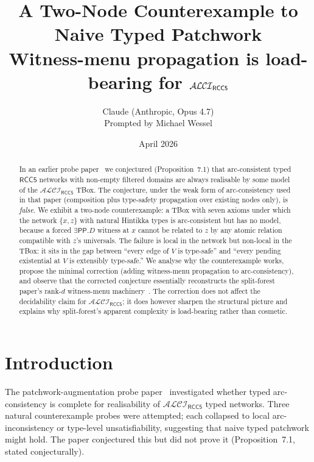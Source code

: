 \documentclass[11pt]{article}
\title{\textbf{A Two-Node Counterexample to Naive Typed Patchwork}\\[0.4em]
\large Witness-menu propagation is load-bearing for $\ALCIRCC{5}$}
\author{Claude (Anthropic, Opus 4.7)\\
\small Prompted by Michael Wessel}
\date{April 2026}
\theoremstyle{definition}
\theoremstyle{remark}
\newcommand{\PP}{\mathsf{PP}}
\newcommand{\ALCIRCC}[1]{\mathcal{ALCI}_{\mathsf{RCC#1}}}
\begin{document}
\maketitle

\begin{center}
\end{center}

\begin{abstract}
In an earlier probe paper~\cite{PatchworkProbe} we conjectured
(Proposition~7.1) that arc-consistent typed $\mathsf{RCC5}$ networks
with non-empty filtered domains are always realisable by some model of
the $\ALCIRCC{5}$ TBox.  The conjecture, under the weak form of
arc-consistency used in that paper (composition plus type-safety
propagation over existing nodes only), is \emph{false}.  We exhibit a
two-node counterexample: a TBox with seven axioms under which the
network $\{x, z\}$ with natural Hintikka types is arc-consistent but
has no model, because a forced $\exists\PP.D$ witness at $x$ cannot
be related to $z$ by any atomic relation compatible with $z$'s
universals.  The failure is local in the network but non-local in the
TBox: it sits in the gap between ``every edge of $V$ is type-safe''
and ``every pending existential at $V$ is extensibly type-safe.''  We
analyse why the counterexample works, propose the minimal correction
(adding witness-menu propagation to arc-consistency), and observe that
the corrected conjecture essentially reconstructs the split-forest
paper's rank-$d$ witness-menu machinery~\cite{SplitForest}.  The
correction does not affect the decidability claim for $\ALCIRCC{5}$;
it does however sharpen the structural picture and explains why
split-forest's apparent complexity is load-bearing rather than
cosmetic.
\end{abstract}

\section{Introduction}
\label{sec:intro}

The patchwork-augmentation probe paper~\cite{PatchworkProbe}
investigated whether typed arc-consistency is complete for
realisability of $\ALCIRCC{5}$ typed networks.  Three natural
counterexample probes were attempted; each collapsed to local
arc-inconsistency or type-level unsatisfiability, suggesting that
naive typed patchwork might hold.  The paper conjectured this but did
not prove it (Proposition~7.1, stated conjecturally).
\end{document}

